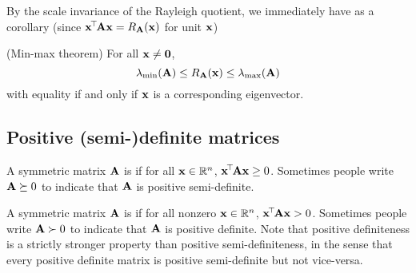 By the scale invariance of the Rayleigh quotient, we immediately have as a corollary (since $\mathbf{x}^{\!\top\!}\mathbf{A}\mathbf{x} = R_{\mathbf{A}}(\mathbf{x})$ for unit $\mathbf{x}$)
\begin{theorem}
(Min-max theorem)
For all $\mathbf{x} \neq \mathbf{0}$,
\[\lambda_{\min}(\mathbf{A}) \leq R_{\mathbf{A}}(\mathbf{x}) \leq \lambda_{\max}(\mathbf{A})\]
with equality if and only if $\mathbf{x}$ is a corresponding eigenvector.
\end{theorem}

\subsection{Positive (semi-)definite matrices}
A symmetric matrix $\mathbf{A}$ is  if for all $\mathbf{x} \in \mathbb{R}^n$, $\mathbf{x}^{\!\top\!}\mathbf{A}\mathbf{x} \geq 0$.
Sometimes people write $\mathbf{A} \succeq 0$ to indicate that $\mathbf{A}$ is positive semi-definite.

A symmetric matrix $\mathbf{A}$ is  if for all nonzero $\mathbf{x} \in \mathbb{R}^n$, $\mathbf{x}^{\!\top\!}\mathbf{A}\mathbf{x} > 0$.
Sometimes people write $\mathbf{A} \succ 0$ to indicate that $\mathbf{A}$ is positive definite.
Note that positive definiteness is a strictly stronger property than positive semi-definiteness, in the sense that every positive definite matrix is positive semi-definite but not vice-versa. 

